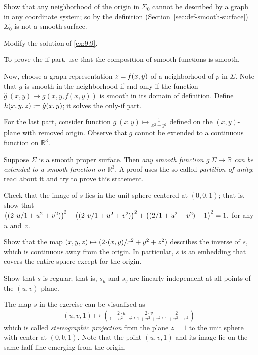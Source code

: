 Show that any neighborhood of the origin in $\Sigma_0$ cannot be described by a graph in any coordinate system;
so by the definition (Section~\ref{sec:def-smooth-surface}) $\Sigma_0$ is not a smooth surface.

 Modify the solution of \ref{ex:9:9}.

To prove the if part, use that the composition of smooth functions is smooth.

Now, choose a graph representation $z\z=f(x,y)$ of a neighborhood of $p$ in $\Sigma$.
Note that $g$ is smooth in the neighborhood if and only if the function $\hat g\:(x,y)\mapsto g(x,y,f(x,y))$ is smooth in its domain of definition.
Define $h(x,y,z)\z\df \hat g(x,y)$; it solves the only-if part.

For the last part, consider function $g\:(x,y)\mapsto\tfrac1{x^2+y^2}$ defined on the $(x,y)$-plane with removed origin.
Observe that $g$ cannot be extended to a continuous function on $\mathbb{R}^3$.

 Suppose $\Sigma$ is a smooth proper surface.
Then \textit{any smooth function $g\:\Sigma\to\mathbb{R}$ can be extended to a smooth function on $\mathbb{R}^3$}.
A proof uses the so-called \emph{partition of unity};
read about it and try to prove this statement.


Check that the image of $s$ lies in the unit sphere centered at $(0,0,1)$;
that is, show that 
$\left(\tfrac{2\cdot u}{1+u^2+v^2}\right)^2
\z+
\left(\tfrac{2\cdot v}{1+u^2+v^2}\right)^2
\z+
\left(\tfrac{2}{1+u^2+v^2}-1\right)^2=1.
$
for any $u$ and~$v$.

Show that the map 
$(x,y,z)\z\mapsto \tfrac{2\cdot(x,y)}{x^2+y^2+z^2}$
describes the inverse of $s$, which is continuous away from the origin.
In particular, $s$ is an embedding that covers the entire sphere except for the origin.

Show that $s$ is regular; that is, $s_u$ and $s_v$ are linearly independent at all points of the $(u,v)$-plane.

The map $s$ in the exercise can be visualized as
\[(u,v,1)\mapsto (\tfrac{2\cdot u}{1+u^2+v^2},\tfrac{2\cdot v}{1+u^2+v^2},\tfrac{2}{1+u^2+v^2})\]
which is called \emph{stereographic projection} from the plane $z=1$ to the unit sphere with center at $(0,0,1)$.
Note that the point $(u,v,1)$ and its image lie on the same half-line emerging from the origin. 

